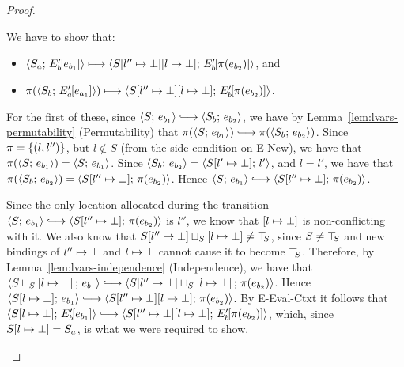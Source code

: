 \begin{proof}
\begin{enumerate}
\begin{enumerate}
\begin{itemize}
          We have to show that:
          \begin{itemize}
          \item
            $\langle S_a;\, E'_b\hspace{-1mm}\left[e_{b_1}\right] \rangle \longmapsto
            \langle S[l'' \mapsto \bot][l \mapsto \bot];\, E'_b\hspace{-1mm}\left[\pi(e_{b_2})\right] \rangle$,
            and
          \item
            $\pi(\langle S_b;\, E'_a\hspace{-1mm}\left[e_{a_1}\right] \rangle) \longmapsto
            \langle S[l'' \mapsto \bot][l \mapsto \bot];\, E'_b\hspace{-1mm}\left[\pi(e_{b_2})\right] \rangle$.
          \end{itemize}

          For the first of these, since $\config{S}{e_{b_1}}
          \parstepsto \config{S_b}{e_{b_2}}$, we have by
          Lemma~\ref{lem:lvars-permutability} (Permutability) that
          $\pi(\config{S}{e_{b_1}}) \parstepsto
          \pi(\config{S_b}{e_{b_2}})$.  Since $\pi = \left\{(l,
            l'')\right\}$, but $l \notin S$ (from the side condition on {\sc
            E-New}), we have that $\pi(\langle S;\, e_{b_1} \rangle) =
          \langle S;\, e_{b_1} \rangle$. Since $\langle S_b;\, e_{b_2} \rangle =
          \langle S[l' \mapsto \bot];\, l' \rangle$, and $l = l'$, we have
          that $\pi(\langle S_b;\, e_{b_2} \rangle) =
          \langle S[l'' \mapsto \bot];\, \pi(e_{b_2}) \rangle$.  Hence
          $\config{S}{e_{b_1}} \parstepsto
          \config{\extSRaw{S}{l''}{\bot}}{\pi(e_{b_2})}$.

          Since the only location allocated during the transition
          $\config{S}{e_{b_1}} \parstepsto
          \config{\extSRaw{S}{l''}{\bot}}{\pi(e_{b_2})}$ is $l''$, we
          know that $\left[ l \mapsto \bot \right]$ is
          non-conflicting with it.  We also know that
          $S[l'' \mapsto \bot] \sqcup_{S} \left[ l \mapsto \bot \right]
          \neq \top\hspace{-0.85mm}_{S}$, since $S \neq \top\hspace{-0.85mm}_{S}$ and new bindings of
          $l'' \mapsto \bot$ and
          $l \mapsto \bot$ cannot cause it to become
          $\top\hspace{-0.85mm}_{S}$.  Therefore, by Lemma~\ref{lem:lvars-independence}
          (Independence), we have that
          $\config{\lubstore{S}{\store{\storebindingRaw{l}{\bot}}}}{e_{b_1}}
          \parstepsto
          \config{\lubstore{\extSRaw{S}{l''}{\bot}}{\store{\storebindingRaw{l}{\bot}}}}{\pi(e_{b_2})}$.
          Hence $\config{\extSRaw{S}{l}{\bot}}{e_{b_1}} \parstepsto
          \config{\extSRaw{\extSRaw{S}{l''}{\bot}}{l}{\bot}}{\pi(e_{b_2})}$.
          By {\sc E-Eval-Ctxt} it follows that
          $\config{\extSRaw{S}{l}{\bot}}{\evalctxt{E'_b}{e_{b_1}}}
          \parstepsto
          \config{\extSRaw{\extSRaw{S}{l''}{\bot}}{l}{\bot}}{\evalctxt{E'_b}{\pi(e_{b_2})}}$,
          which, since $S[l \mapsto \bot] = S_a$, is what we were
          required to show.


\end{itemize}
\end{enumerate}
\end{enumerate}
\end{proof}
